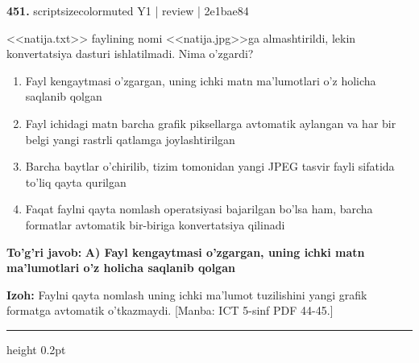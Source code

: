 \documentclass[10pt,a4paper]{article}
\begin{document}
{\bfseries\sffamily\color{ink} 451.} {scriptsizecolor{muted} Y1 | review | 2e1bae84}
\par
<<natija.txt>> faylining nomi <<natija.jpg>>ga almashtirildi, lekin konvertatsiya dasturi ishlatilmadi. Nima o'zgardi?
\begin{enumerate}[label=\Alph*),leftmargin=9mm]
\item Fayl kengaytmasi o'zgargan, uning ichki matn ma'lumotlari o'z holicha saqlanib qolgan
\item Fayl ichidagi matn barcha grafik piksellarga avtomatik aylangan va har bir belgi yangi rastrli qatlamga joylashtirilgan
\item Barcha baytlar o'chirilib, tizim tomonidan yangi JPEG tasvir fayli sifatida to'liq qayta qurilgan
\item Faqat faylni qayta nomlash operatsiyasi bajarilgan bo'lsa ham, barcha formatlar avtomatik bir-biriga konvertatsiya qilinadi
\end{enumerate}
\begin{tcolorbox}[enhanced,breakable,colback=teal!4,colframe=teal!60!black,boxrule=0.45pt,arc=1.2mm,left=2.7mm,right=2.7mm,top=1.8mm,bottom=1.8mm,before skip=2mm,after skip=2mm]
{\bfseries\sffamily\color{teal}To'g'ri javob:} \textbf{A) Fayl kengaytmasi o'zgargan, uning ichki matn ma'lumotlari o'z holicha saqlanib qolgan}
\par\smallskip
{\bfseries Izoh:} Faylni qayta nomlash uning ichki ma'lumot tuzilishini yangi grafik formatga avtomatik o'tkazmaydi. [Manba: ICT 5-sinf PDF 44-45.]
\end{tcolorbox}
\vspace{2mm}\hrule height 0.2pt\vspace{3mm}
\end{document}
